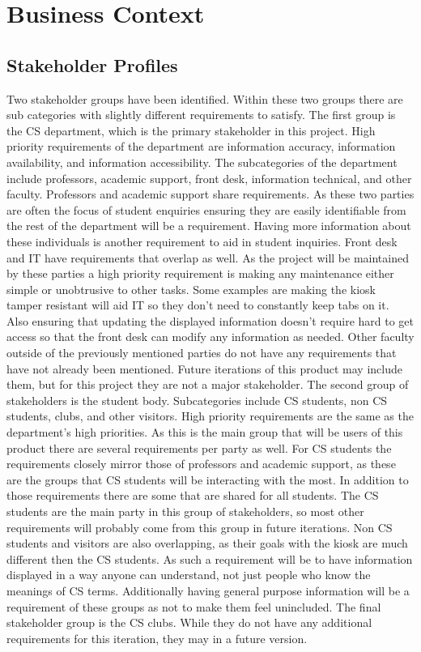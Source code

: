 
\section{Business Context}

\subsection{Stakeholder Profiles}
 Two stakeholder groups have been identified. Within these two groups there are sub categories with slightly different requirements to satisfy. The first group is the CS department, which is the primary stakeholder in this project. High priority requirements of the department are information accuracy, information availability, and information accessibility. The subcategories of the department include professors, academic support, front desk, information technical, and other faculty.
 Professors and academic support share requirements. As these two parties are often the focus of student enquiries ensuring they are easily identifiable from the rest of the department will be a requirement. Having more information about these individuals is another requirement to aid in student inquiries.
 Front desk and IT have requirements that overlap as well. As the project will be maintained by these parties a high priority requirement is making any maintenance either simple or unobtrusive to other tasks. Some examples are making the kiosk tamper resistant will aid IT so they don’t need to constantly keep tabs on it. Also ensuring that updating the displayed information doesn’t require hard to get access so that the front desk can modify any information as needed.
 Other faculty outside of the previously mentioned parties do not have any requirements that have not already been mentioned. Future iterations of this product may include them, but for this project they are not a major stakeholder.
 The second group of stakeholders is the student body. Subcategories include CS students, non CS students, clubs, and other visitors. High priority requirements are the same as the department's high priorities. As this is the main group that will be users of this product there are several requirements per party as well.
 For CS students the requirements closely mirror those of professors and academic support, as these are the groups that CS students will be interacting with the most. In addition to those requirements there are some that are shared for all students. The CS students are the main party in this group of stakeholders, so most other requirements will probably come from this group in future iterations. 
 Non CS students and visitors are also overlapping, as their goals with the kiosk are much different then the CS students. As such a requirement will be to have information displayed in a way anyone can understand, not just people who know the meanings of CS terms. Additionally having general purpose information will be a requirement of these groups as not to make them feel unincluded.
 The final stakeholder group is the CS clubs. While they do not have any additional requirements for this iteration, they may in a future version.


